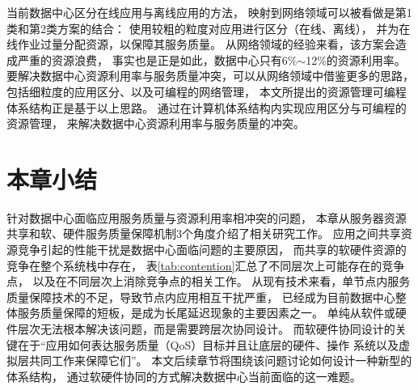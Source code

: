 当前数据中心区分在线应用与离线应用的方法，
映射到网络领域可以被看做是第1类和第2类方案的结合：
使用较粗的粒度对应用进行区分（在线、离线），
并为在线作业过量分配资源，以保障其服务质量。
从网络领域的经验来看，该方案会造成严重的资源浪费，
事实也是正是如此，数据中心只有6\%$\sim$12\%的资源利用率。
要解决数据中心资源利用率与服务质量冲突，可以从网络领域中借鉴更多的思路，
包括细粒度的应用区分、以及可编程的网络管理，
本文所提出的资源管理可编程体系结构正是基于以上思路。
通过在计算机体系结构内实现应用区分与可编程的资源管理，
来解决数据中心资源利用率与服务质量的冲突。



\section{本章小结}

针对数据中心面临应用服务质量与资源利用率相冲突的问题，
本章从服务器资源共享和软、硬件服务质量保障机制3个角度介绍了相关研究工作。
应用之间共享资源竞争引起的性能干扰是数据中心面临问题的主要原因，
而共享的软硬件资源的竞争在整个系统栈中存在，
表\ref{tab:contention}汇总了不同层次上可能存在的竞争点，
以及在不同层次上消除竞争点的相关工作。
从现有技术来看，单节点内服务质量保障技术的不足，导致节点内应用相互干扰严重，
已经成为目前数据中心整体服务质量保障的短板，是成为长尾延迟现象的主要因素之一。
单纯从软件或硬件层次无法根本解决该问题，而是需要跨层次协同设计。
而软硬件协同设计的关键在于``应用如何表达服务质量（QoS）目标并且让底层的硬件、操作
系统以及虚拟层共同工作来保障它们''\cite{21st_architecture}。
本文后续章节将围绕该问题讨论如何设计一种新型的体系结构，
通过软硬件协同的方式解决数据中心当前面临的这一难题。

